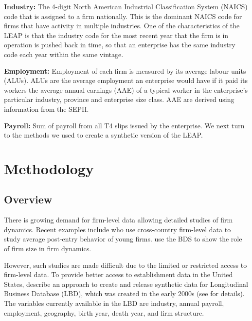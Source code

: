 \documentclass{article}
\begin{document}
\textbf{Industry:} The 4-digit North American Industrial Classification System (NAICS) code that is assigned to a firm nationally. This is the dominant NAICS code for firms that have activity in multiple industries. One of the characteristics of the LEAP is that the industry code for the most recent year that the firm is in operation is pushed back in time, so that an enterprise has the same industry code each year within the same vintage.  

\textbf{Employment:} Employment of each firm is measured by its average labour units (ALUs). ALUs are the average employment an enterprise would have if it paid its workers the average annual earnings (AAE) of a typical worker in the enterprise's particular industry, province and enterprise size class. AAE are derived using information from the SEPH.

\textbf{Payroll:} Sum of payroll from all T4 slips issued by the enterprise.
We next turn to the methods we used to create a synthetic version of the LEAP.

\section{Methodology}

\subsection{Overview}

There is growing demand for firm-level data allowing detailed studies of firm dynamics. Recent examples include \textcite{NBERc0480} who use cross-country firm-level data to study average post-entry behavior of young firms. \textcite{10.1257/aer.20141280} use the BDS  to show the role of firm size in firm dynamics. %

However, such studies are made difficult due to the limited or restricted access to firm-level data.%
To provide better access to establishment data in the United States, \textcite{RePEc:bla:istatr:v:79:y:2011:i:3:p:362-384} describe an approach to create and release synthetic data for Longitudinal Business Database (LBD), which was created in the early 2000s (see \textcite{RePEc:cen:wpaper:02-17} for details). The variables currently available in the LBD are industry, annual payroll, employment, geography, birth year, death year, and firm structure.    
\end{document}
